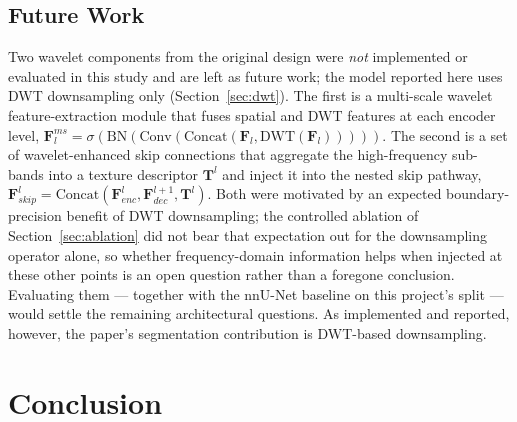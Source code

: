 \documentclass[conference]{IEEEtran}
\begin{document}
\subsection{Future Work}
Two wavelet components from the original design were \emph{not} implemented or evaluated in this study and are left as future work; the model reported here uses DWT downsampling only (Section~\ref{sec:dwt}). The first is a multi-scale wavelet feature-extraction module that fuses spatial and DWT features at each encoder level, $\mathbf{F}_l^{ms} = \sigma(\text{BN}(\text{Conv}(\text{Concat}(\mathbf{F}_l, \text{DWT}(\mathbf{F}_l)))))$. The second is a set of wavelet-enhanced skip connections that aggregate the high-frequency sub-bands into a texture descriptor $\mathbf{T}^l$ and inject it into the nested skip pathway, $\mathbf{F}_{skip}^l = \text{Concat}(\mathbf{F}_{enc}^l, \mathbf{F}_{dec}^{l+1}, \mathbf{T}^l)$. Both were motivated by an expected boundary-precision benefit of DWT downsampling; the controlled ablation of Section~\ref{sec:ablation} did not bear that expectation out for the downsampling operator alone, so whether frequency-domain information helps when injected at these other points is an open question rather than a foregone conclusion. Evaluating them --- together with the nnU-Net baseline on this project's split --- would settle the remaining architectural questions. As implemented and reported, however, the paper's segmentation contribution is DWT-based downsampling.

\section{Conclusion}
\label{sec:conclusion}
\end{document}
